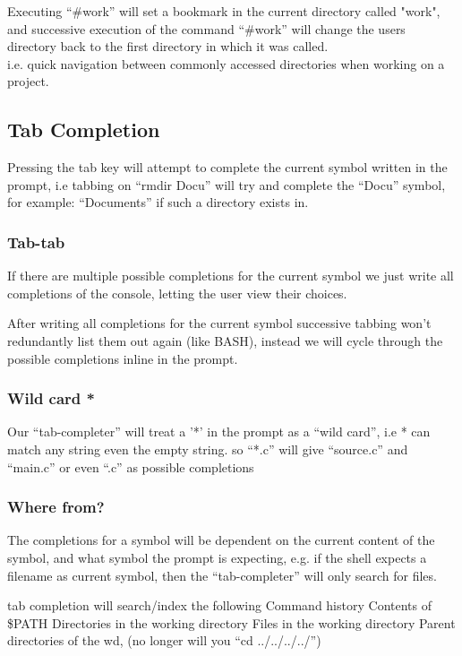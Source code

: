 \documentclass[a4paper,12pt]{article}
\begin{document}
Executing ``\#work'' will set a bookmark in the current directory called "work", and successive execution of the command ``\#work'' will change the users directory back to the first directory in which it was called.\\[0.5cm]
i.e. quick navigation between commonly accessed directories when working on a project.

\pagebreak
\subsection*{Tab Completion}

Pressing the tab key will attempt to complete the current symbol written in the prompt, i.e tabbing on ``rmdir Docu'' will try and complete the ``Docu'' symbol, for example: ``Documents'' if such a directory exists in.

\subsubsection*{Tab-tab}
If there are multiple possible completions for the current symbol we just write all completions of the console, letting the user view their choices.

After writing all completions for the current symbol successive tabbing  won't redundantly list them out again (like BASH), instead we will cycle through the possible completions inline in the prompt.  

\subsubsection*{Wild card *}
Our ``tab-completer'' will treat a '*' in the prompt as a ``wild card'', i.e * can match any string even the empty string. so ``*.c'' will give ``source.c'' and ``main.c'' or even ``.c'' as possible completions

\subsubsection*{Where from?}
The completions for a symbol will be dependent on the current content of the symbol, and what symbol the prompt is expecting, e.g. if the shell expects a filename as current symbol, then the ``tab-completer'' will only search for files.

tab completion will search/index the following
Command history
Contents of \$PATH
Directories in the working directory
Files in the working directory
Parent directories of the wd, (no longer will you ``cd ../../../../'')
\end{document}
